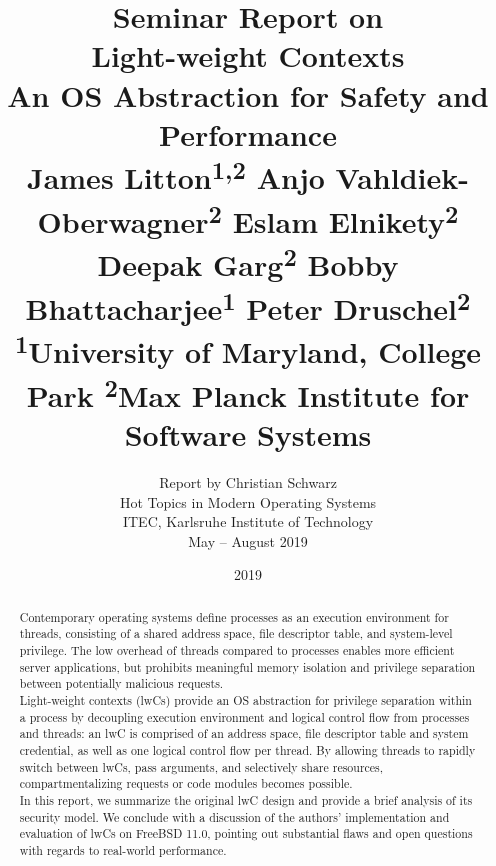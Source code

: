 \documentclass[10pt,twocolumn,a4paper]{article}
\begin{document}
\title{%
  {\normalfont \normalsize Seminar Report on}\\%
  Light-weight Contexts\\%
  {\normalfont \normalsize An OS Abstraction for Safety and Performance}\\%
  {\normalfont \small %
    James Litton\textsuperscript{1,2}
    Anjo Vahldiek-Oberwagner\textsuperscript{2}
    Eslam Elnikety\textsuperscript{2}
    Deepak Garg\textsuperscript{2}
    Bobby Bhattacharjee\textsuperscript{1}
    Peter Druschel\textsuperscript{2}
  }\\
  {\normalfont \small
    \textsuperscript{1}University of Maryland, College Park 
    \textsuperscript{2}Max Planck Institute for Software Systems
  }%
}
\author{%
Report by Christian Schwarz\\%
{\small Hot Topics in Modern Operating Systems}\\%
{\small ITEC, Karlsruhe Institute of Technology}\\%
{\small May -- August 2019}\\%
\vspace{1em}
}
\date{2019}

\maketitle

\begin{abstract}
Contemporary operating systems define processes as an execution environment for threads, consisting of a shared address space, file descriptor table, and system-level privilege.
The low overhead of threads compared to processes enables more efficient server applications, but prohibits meaningful memory isolation and privilege separation between potentially malicious requests.\\
Light-weight contexts (lwCs) provide an OS abstraction for privilege separation within a process by decoupling execution environment and logical control flow from processes and threads:
an lwC is comprised of an address space, file descriptor table and system credential, as well as one logical control flow per thread.
By allowing threads to rapidly switch between lwCs, pass arguments, and selectively share resources, compartmentalizing requests or code modules becomes possible.\\
In this report, we summarize the original lwC design and provide a brief analysis of its security model.
We conclude with a discussion of the authors' implementation and evaluation of lwCs on FreeBSD 11.0, pointing out substantial flaws and open questions with regards to real-world performance.
\end{abstract}
\end{document}
